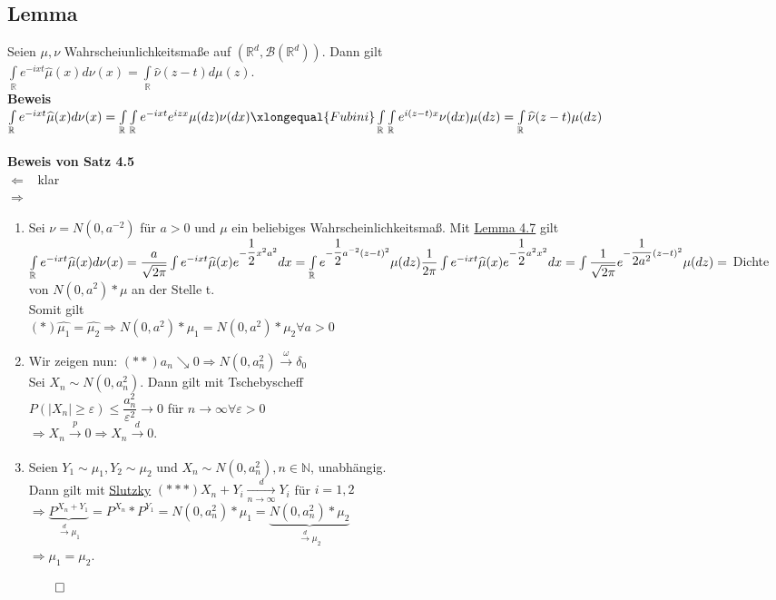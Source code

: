 \documentclass[german,10pt,oneside, fleqn, a4paper]{article}
\newcommand{\tscheb}{Tschebyscheff}
\newcommand {\R}	{\mathbb{R}}
\newcommand {\N}	{\mathbb{N}}
\newcommand{\Ra}	{\Rightarrow}
\newcommand{\La}	{\Leftarrow}
\newcommand{\ra}{\rightarrow}
\newcommand{\brc}[1]{\left(#1\right)}
\newcommand{\QED}{\begin{flushright}$\qed$\end{flushright}}
\newcommand{\mc}[1]{\mathcal{#1}}
\newcommand{\beweis}{\textbf{Beweis}\\}
\newcommand{\toinf}{\rightarrow\infty}
\newcommand{\1}[1]{1_{#1}}
\newcommand{\2}[1]{\1{\brac{#1}}}
\newcommand{\xr}[2][]{\xrightarrow[#1]{#2}}
\newcommand{\rbor}[1][d]{\brc{\R^{#1},\mc{B}\brc{\R^{#1}}}}
\begin{document}
\subsection{Lemma}
\label{4.7}
Seien $\mu,\nu$ Wahrscheiunlichkeitsmaße auf $\rbor$. Dann gilt\\
$\int\limits_\R e^{-ixt}\widehat{\mu}(x)d\nu(x)=\int\limits_\R\widehat{\nu}(z-t)d\mu(z).$\\
\beweis
$\int\limits_\R e^{-ixt}\widehat{\mu}(x)d\nu(x)=\int\limits_\R\int\limits_\R e^{-ixt}e^{izx}\mu(dz)\nu(dx)\\
\xlongequal{Fubini}\int\limits_\R\int\limits_\R e^{i(z-t)x}\nu(dx)\mu(dz)=\int\limits_\R\widehat\nu(z-t)\mu(dz)$\\
\\
\textbf{Beweis von Satz 4.5}\\
\glqq $\La$ \grqq \ klar\\
\glqq $\Ra$ \grqq\begin{enumerate}
\item Sei $\nu=N(0,a^{-2})$ für $a>0$ und $\mu$ ein beliebiges Wahrscheinlichkeitsmaß. Mit \hyperref[4.7]{Lemma 4.7} gilt\\
$\int\limits_\R e^{-ixt}\widehat{\mu}(x)d\nu(x)=\dfrac{a}{\sqrt{2\pi}}\int e^{-ixt}\widehat{\mu}(x)e^{-\dfrac{1}{2}x^2a^2}dx\\
=\int\limits_\R e^{-\dfrac{1}{2}a^{-2}(z-t)^2}\mu(dz)\\
\dfrac{1}{2\pi}\int e^{-ixt}\widehat{\mu}(x)e^{-\dfrac{1}{2}a^2x^2}dx = \int\dfrac{1}{\sqrt{2\pi}}e^{-\dfrac{1}{2a^2}(z-t)^2}\mu(dz)\\
=$ Dichte von $N(0,a^2)*\mu$ an der Stelle t.\\
Somit gilt \\
$(*)\widehat{\mu_1}=\widehat{\mu_2}\Ra N(0,a^2)*\mu_1=N(0,a^2)*\mu_2 \forall a>0$
\item Wir zeigen nun:
$(**) a_n\searrow0\Ra N(0,a_n^2)\xr{\omega}\delta_0$\\
Sei $X_n\sim N(0,a_n^2).$ Dann gilt mit \tscheb\\
$P(|X_n|\geq\varepsilon)\leq\dfrac{a_n^2}{\varepsilon^2}\ra0$ für $n\toinf\forall\varepsilon>0$\\
$\Ra X_n\xr{p}0\Ra X_n\xr{d}0$.
\item Seien $Y_1\sim\mu_1, Y_2\sim\mu_2$ und $X_n\sim N(0,a_n^2), n\in\N$, unabhängig. \\
Dann gilt mit \hyperref[3.12]{Slutzky}
$(***) X_n+Y_i\xr[n\toinf]{d}Y_i$ für $i=1,2$\\
$\Ra \underbrace{P^{X_n+Y_1}}_{\xr{d}\mu_1}=P^{X_n}*P^{Y_1}=N(0,a_n^2)*\mu_1=\underbrace{N(0,a_n^2)*\mu_2}_{\xr{d}\mu_2}$\\
$\Ra \mu_1=\mu_2$.\QED
\end{enumerate}
\end{document}
